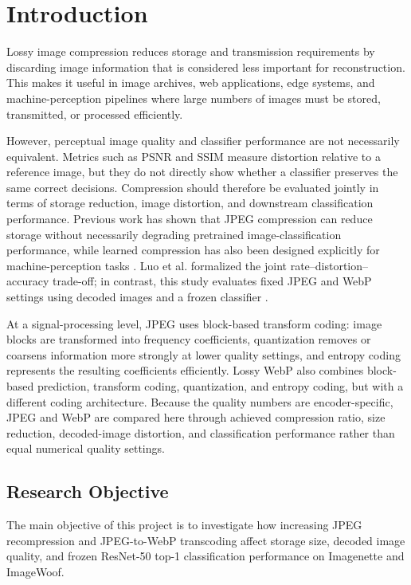 \section{Introduction}

Lossy image compression reduces storage and transmission requirements by discarding image information that is considered less important for reconstruction. This makes it useful in image archives, web applications, edge systems, and machine-perception pipelines where large numbers of images must be stored, transmitted, or processed efficiently.

However, perceptual image quality and classifier performance are not necessarily equivalent. Metrics such as PSNR and SSIM measure distortion relative to a reference image, but they do not directly show whether a classifier preserves the same correct decisions. Compression should therefore be evaluated jointly in terms of storage reduction, image distortion, and downstream classification performance. Previous work has shown that JPEG compression can reduce storage without necessarily degrading pretrained image-classification performance, while learned compression has also been designed explicitly for machine-perception tasks \cite{yang2021compression,codevilla2021learned}. Luo et al. formalized the joint rate--distortion--accuracy trade-off; in contrast, this study evaluates fixed JPEG and WebP settings using decoded images and a frozen classifier \cite{luo2021rda}.

At a signal-processing level, JPEG uses block-based transform coding: image blocks are transformed into frequency coefficients, quantization removes or coarsens information more strongly at lower quality settings, and entropy coding represents the resulting coefficients efficiently. Lossy WebP also combines block-based prediction, transform coding, quantization, and entropy coding, but with a different coding architecture. Because the quality numbers are encoder-specific, JPEG and WebP are compared here through achieved compression ratio, size reduction, decoded-image distortion, and classification performance rather than equal numerical quality settings.

\subsection{Research Objective}

The main objective of this project is to investigate how increasing JPEG recompression and JPEG-to-WebP transcoding affect storage size, decoded image quality, and frozen ResNet-50 top-1 classification performance on Imagenette and ImageWoof.

